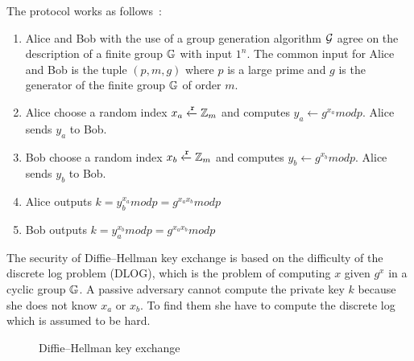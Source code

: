 The protocol works as follows~\cite{Katz:2014:IMC:2700550, kiagias:crypto}:

\begin{enumerate}
  \item Alice and Bob  with the use of a group generation algorithm $\mathcal{G}$ agree on the description of a finite group $\mathbb{G}$ with input $1^{n}$. The common input for Alice and Bob is the tuple $(p, m, g)$ where $p$ is a large prime and $g$ is the generator of the finite group $\mathbb{G}$ of order $m$.
  \item Alice choose a random index $x_a \xleftarrow{\mathtt{r}}{\mathbb{Z}_m}$ and computes $y_a \leftarrow{g^{x_a}}modp$. Alice sends $y_a$ to Bob.
  \item Bob choose a random index $x_b \xleftarrow{\mathtt{r}}{\mathbb{Z}_m}$ and computes $y_b \leftarrow{g^{x_b}}modp$. Alice sends $y_b$ to Bob.
  \item Alice outputs $k = y_b^{x_a}modp = g^{{x_a}{x_b}}modp$
  \item Bob outputs $k = y_a^{x_b}modp = g^{{x_a}{x_b}}modp$
\end{enumerate}

The security of Diffie–Hellman key exchange is based on the difficulty of the discrete log problem (DLOG), which is the problem of computing $x$ given $g^{x}$ in a cyclic group $\mathbb{G}$. A passive adversary cannot compute the private key $k$ because she does not know $x_a$ or $x_b$. To find them she have to compute the discrete log which is assumed to be hard.

\begin{figure}[!hb]
  \centering
  \caption{Diffie–Hellman key exchange}
  \label{fig:crypto:dh}
\end{figure}

